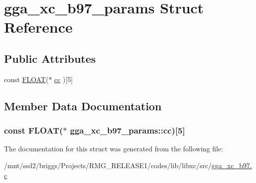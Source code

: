 \hypertarget{structgga__xc__b97__params}{\section{gga\-\_\-xc\-\_\-b97\-\_\-params Struct Reference}
\label{structgga__xc__b97__params}
}
\subsection*{Public Attributes}
\begin{DoxyCompactItemize}
\item 
const \hyperlink{src_2xc__config_8h_ae8690abbffa85934d64d545920e2b108}{F\-L\-O\-A\-T}($\ast$ \hyperlink{structgga__xc__b97__params_a0587fd458184a5794993909eb845bf8e}{cc} )\mbox{[}5\mbox{]}
\end{DoxyCompactItemize}


\subsection{Member Data Documentation}
\hypertarget{structgga__xc__b97__params_a0587fd458184a5794993909eb845bf8e}{
\subsubsection[{cc}]{\setlength{\rightskip}{0pt plus 5cm}const {\bf F\-L\-O\-A\-T}($\ast$ gga\-\_\-xc\-\_\-b97\-\_\-params\-::cc)\mbox{[}5\mbox{]}}}\label{structgga__xc__b97__params_a0587fd458184a5794993909eb845bf8e}


The documentation for this struct was generated from the following file\-:\begin{DoxyCompactItemize}
\item 
/mnt/ssd2/briggs/\-Projects/\-R\-M\-G\-\_\-\-R\-E\-L\-E\-A\-S\-E1/codes/lib/libxc/src/\hyperlink{gga__xc__b97_8c}{gga\-\_\-xc\-\_\-b97.\-c}\end{DoxyCompactItemize}
